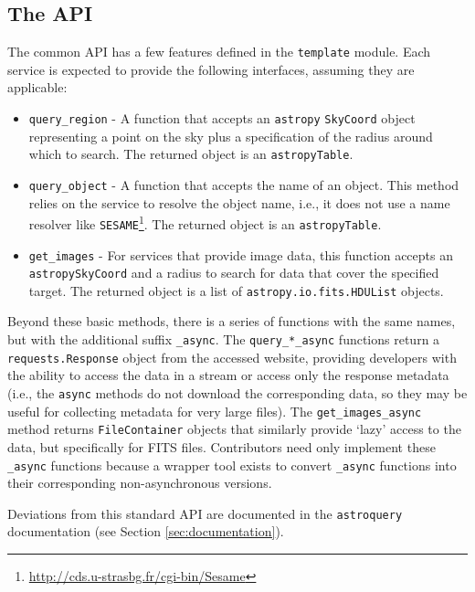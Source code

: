 \documentclass[twocolumn]{aastex62}
\newcommand{\package}[1]{\texttt{#1}\xspace}
\newcommand{\astroquery}{\package{astroquery}}
\newcommand{\astropypkg}{\package{astropy}}
\begin{document}
\subsection{The API}
The common API has a few features defined in the \texttt{template} module.
Each service is expected to provide the following interfaces, assuming they are
applicable:

\begin{itemize}
    \item \texttt{query\_region} - A function that accepts an \astropypkg
        \texttt{SkyCoord} object representing a point on the sky plus a
        specification of the radius around which to search.
        The returned object is an \astropypkg \texttt{Table}.
    \item \texttt{query\_object} - A function that accepts the name of an
        object.  This method relies on the service to resolve the object name, i.e., it does not use a name resolver
        like \texttt{SESAME}\footnote{\url{http://cds.u-strasbg.fr/cgi-bin/Sesame}}.
        The returned object is an \astropypkg \texttt{Table}.
    \item \texttt{get\_images} - For services that provide image data, this
        function accepts an \astropypkg \texttt{SkyCoord} and a radius to search for data
        that cover the specified target. The returned object is a list
        of \texttt{astropy.io.fits.HDUList} objects.

\end{itemize}

Beyond these basic methods, there is a series of functions with the same
names, but with the additional suffix \texttt{\_async}.  The
\texttt{query\_*\_async} functions return a \texttt{requests.Response} object
from the accessed website, providing developers with
the ability to access the data in a stream or access only the response
metadata (i.e., the \texttt{async} methods do not download the corresponding
data, so they may be useful for collecting metadata for very large files).  The
\texttt{get\_images\_async} method returns
\texttt{FileContainer} objects that similarly provide `lazy' access to the
data, but specifically for FITS files.  Contributors need only implement
these \texttt{\_async} functions because a wrapper tool exists to convert
\texttt{\_async} functions into their corresponding non-asynchronous versions.

Deviations from this standard API are documented in the \astroquery
documentation (see Section \ref{sec:documentation}).
\end{document}
